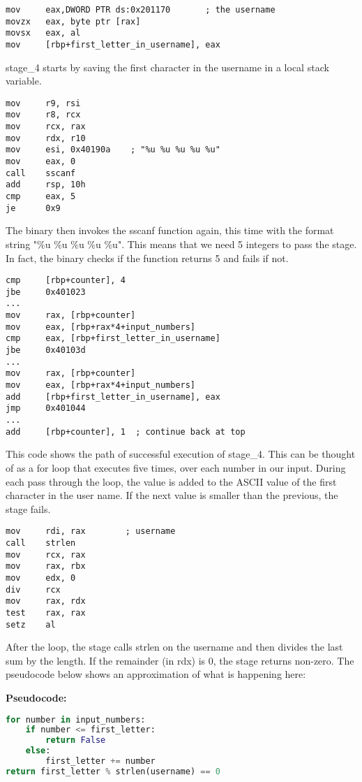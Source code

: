 \documentclass{article}
\begin{document}
\begin{lstlisting}
mov     eax,DWORD PTR ds:0x201170       ; the username
movzx   eax, byte ptr [rax]
movsx   eax, al
mov     [rbp+first_letter_in_username], eax
\end{lstlisting}
stage\_4 starts by saving the first character in the username in a local 
stack variable.  

\begin{lstlisting}
mov     r9, rsi
mov     r8, rcx
mov     rcx, rax
mov     rdx, r10
mov     esi, 0x40190a    ; "%u %u %u %u %u"
mov     eax, 0
call    sscanf
add     rsp, 10h
cmp     eax, 5
je      0x9
\end{lstlisting}

The binary then invokes the sscanf function again, this time with the format 
string "\%u \%u \%u \%u \%u".  This means that we need 5 integers to pass the
stage.  In fact, the binary checks if the function returns 5 and fails if 
not.
\begin{lstlisting}
cmp     [rbp+counter], 4
jbe     0x401023
...
mov     rax, [rbp+counter]
mov     eax, [rbp+rax*4+input_numbers]
cmp     eax, [rbp+first_letter_in_username]
jbe     0x40103d
...
mov     rax, [rbp+counter]
mov     eax, [rbp+rax*4+input_numbers]
add     [rbp+first_letter_in_username], eax
jmp     0x401044
...
add     [rbp+counter], 1  ; continue back at top
\end{lstlisting}
This code shows the path of successful execution of stage\_4.  This can be 
thought of as a for loop that executes five times, over each number in our 
input.  During each pass through the loop, the value is added to the ASCII
value of the first character in the user name.  If the next value is smaller
than the previous, the stage fails.

\begin{lstlisting}
mov     rdi, rax        ; username
call    strlen
mov     rcx, rax
mov     rax, rbx
mov     edx, 0
div     rcx
mov     rax, rdx
test    rax, rax
setz    al
\end{lstlisting}
\par
After the loop, the stage calls strlen on the username and then divides the
last sum by the length.  If the remainder (in rdx) is 0, the stage returns 
non-zero.  The pseudocode below shows an approximation of what is happening 
here:

\begin{flushleft}
\textbf{Pseudocode:}
\vspace{.5pc}
\end{flushleft}
\begin{lstlisting}[language=Python]
for number in input_numbers:
	if number <= first_letter:
		return False
	else:
		first_letter += number
return first_letter % strlen(username) == 0
\end{lstlisting}
\end{document}
